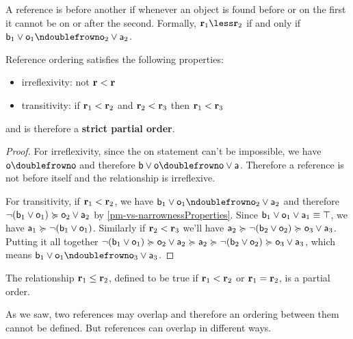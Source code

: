 \begin{mathSection}
	\begin{defn}
		A reference is before another if whenever an object is found before or on the first it cannot be on or after the second. Formally, $\refStmt_1 \less \refStmt_2$ if and only if $\stmt[b]_1 \OR \stmt[o]_1 \ncomp \stmt[o]_2 \OR \stmt[a]_2$.
	\end{defn}
	\begin{prop}
		Reference ordering satisfies the following properties:
		\begin{itemize}
			\item irreflexivity: not $\refStmt < \refStmt$
			\item transitivity: if $\refStmt_1 < \refStmt_2$ and $\refStmt_2 < \refStmt_3$ then $\refStmt_1 < \refStmt_3$
		\end{itemize}
		and is therefore a \textbf{strict partial order}.
	\end{prop}
	\begin{proof}
		For irreflexivity, since the on statement can't be impossible, we have $\stmt[o] \comp \stmt[o]$ and therefore $\stmt[b] \OR \stmt[o] \comp \stmt[o] \OR \stmt[a]$. Therefore a reference is not before itself and the relationship is irreflexive.
		
		For transitivity, if $\refStmt_1 < \refStmt_2$, we have $\stmt[b]_1 \OR \stmt[o]_1 \ncomp \stmt[o]_2 \OR \stmt[a]_2$ and therefore $\NOT (\stmt[b]_1 \OR \stmt[o]_1) \broader \stmt[o]_2 \OR \stmt[a]_2$ by \ref{pm-vs-narrownessProperties}. Since $\stmt[b]_1 \OR \stmt[o]_1 \OR \stmt[a]_1 \equiv \certainty$, we have $\stmt[a]_1 \broader \NOT (\stmt[b]_1 \OR \stmt[o]_1)$. Similarly if $\refStmt_2 < \refStmt_3$ we'll have $\stmt[a]_2 \broader \NOT (\stmt[b]_2 \OR \stmt[o]_2) \broader \stmt[o]_3 \OR \stmt[a]_3$. Putting it all together $\NOT (\stmt[b]_1 \OR \stmt[o]_1) \broader \stmt[o]_2 \OR \stmt[a]_2 \broader \stmt[a]_2 \broader \NOT (\stmt[b]_2 \OR \stmt[o]_2) \broader \stmt[o]_3 \OR \stmt[a]_3$, which means $\stmt[b]_1 \OR \stmt[o]_1 \ncomp \stmt[o]_3 \OR \stmt[a]_3$.
	\end{proof}
	\begin{coro}
		The relationship $\refStmt_1 \leq \refStmt_2$, defined to be true if $\refStmt_1 < \refStmt_2$ or $\refStmt_1 = \refStmt_2$, is a partial order.
	\end{coro}
\end{mathSection}

As we saw, two references may overlap and therefore an ordering between them cannot be defined. But references can overlap in different ways.

